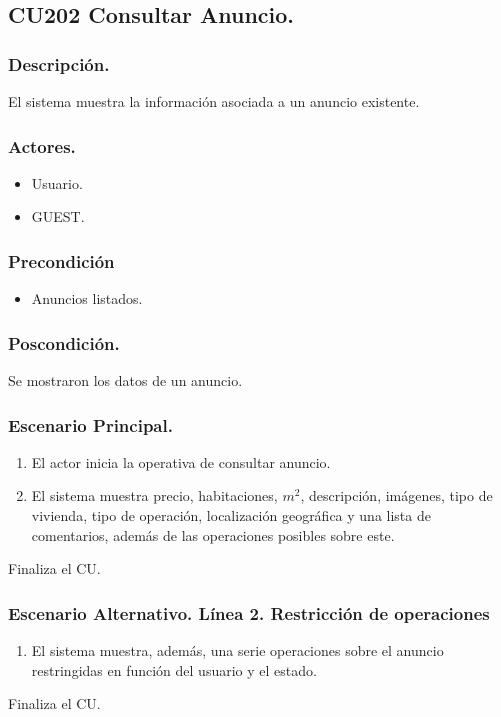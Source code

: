 \subsection{CU202 Consultar Anuncio.}
\subsubsection{Descripci\'{o}n.}
El sistema muestra la informaci\'{o}n asociada a un anuncio existente.
\subsubsection{Actores.}
\begin{itemize}
\item Usuario.
\item GUEST.
\end{itemize}
\subsubsection{Precondici\'{o}n}
\begin{itemize}
\item Anuncios listados.
\end{itemize}
\subsubsection{Poscondici\'{o}n.}
Se mostraron los datos de un anuncio.
\subsubsection{Escenario Principal.}
\begin{enumerate}
\item El actor inicia la operativa de consultar anuncio.
\item El sistema muestra precio, habitaciones, $m^{2}$, descripci\'{o}n, im\'{a}genes, tipo de vivienda, tipo de operaci\'{o}n, localizaci\'{o}n geogr\'{a}fica y una lista de comentarios, adem\'{a}s de las operaciones posibles sobre este.
\end{enumerate}
Finaliza el CU.
\subsubsection{Escenario Alternativo. L\'{i}nea 2. Restricci\'{o}n de operaciones}
\begin{enumerate}
\item El sistema muestra, adem\'{a}s, una serie operaciones sobre el anuncio restringidas en funci\'{o}n del usuario y el estado.
\end{enumerate}
Finaliza el CU.
